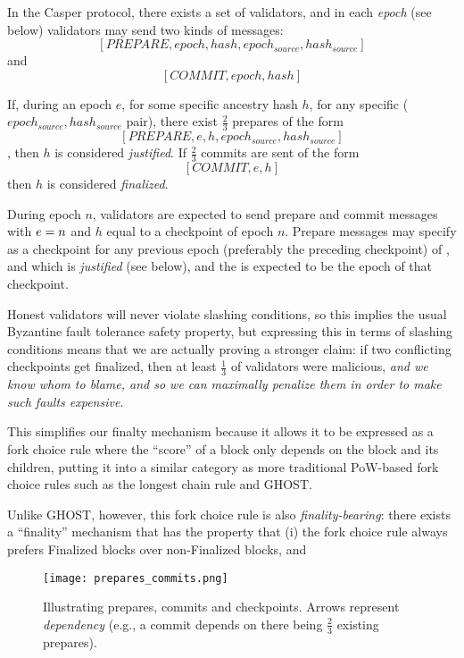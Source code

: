 In the Casper protocol, there exists a set of validators, and in each \textit{epoch} (see below) validators may send two kinds of messages: $$[PREPARE, epoch, hash, epoch_{source}, hash_{source}]$$ and $$[COMMIT, epoch, hash]$$


If, during an epoch $e$, for some specific ancestry hash $h$, for any specific ($epoch_{source}, hash_{source}$ pair), there exist $\frac{2}{3}$ prepares of the form $$[PREPARE, e, h, epoch_{source}, hash_{source}]$$, then $h$ is considered \textit{justified}. If $\frac{2}{3}$ commits are sent of the form $$[COMMIT, e, h]$$ then $h$ is considered \textit{finalized}.


During epoch $n$, validators are expected to send prepare and commit messages with $e = n$ and $h$ equal to a checkpoint of epoch $n$. Prepare messages may specify as \hashsource a checkpoint for any previous epoch (preferably the preceding checkpoint) of \hash, and which is \textit{justified} (see below), and the \epochsource is expected to be the epoch of that checkpoint.


Honest validators will never violate slashing conditions, so this implies the usual Byzantine fault tolerance safety property, but expressing this in terms of slashing conditions means that we are actually proving a stronger claim: if two conflicting checkpoints get finalized, then at least $\frac{1}{3}$ of validators were malicious, \textit{and we know whom to blame, and so we can maximally penalize them in order to make such faults expensive}.


This simplifies our finalty mechanism because it allows it to be expressed as a fork choice rule where the ``score'' of a block only depends on the block and its children, putting it into a similar category as more traditional PoW-based fork choice rules such as the longest chain rule and GHOST\cite{sompolinsky2013accelerating}.

Unlike GHOST, however, this fork choice rule is also \textit{finality-bearing}: there exists a ``finality'' mechanism that has the property that (i) the fork choice rule always prefers Finalized blocks over non-Finalized blocks, and

\begin{figure}[h!tb]
\centering
    \texttt{[image: prepares\_commits.png]}
    \caption{Illustrating prepares, commits and checkpoints. Arrows represent \textit{dependency} (e.g., a commit depends on there being $\frac{2}{3}$ existing prepares).}
    \label{fig:prepares_and_commits}
\end{figure}

